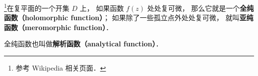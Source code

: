 
\begin{issues}
\issueDraft
\end{issues}


\footnote{参考 Wikipedia 相关页面．}在复平面的一个开集 $D$ 上， 如果函数 $f(z)$ 处处复可微， 那么它就是一个\textbf{全纯函数（holomorphic function）}； 如果除了一些孤立点外处处复可微， 就叫\textbf{亚纯函数（meromorphic function）}．

全纯函数也叫做\textbf{解析函数（analytical function）}．
